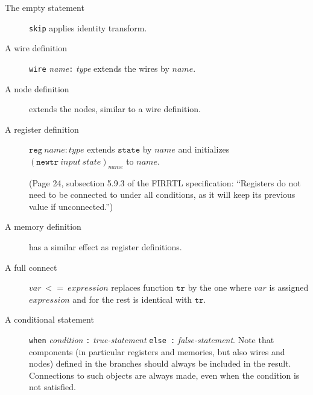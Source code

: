 \documentclass[a4paper]{article}
\begin{document}
\begin{description}

\item[The empty statement] \texttt{skip} applies identity transform.

\item[A wire definition] \texttt{wire} \textit{name}\texttt{:} \textit{type}
	extends the wires by $\mathit{name}$.

\item[A node definition]
	extends the nodes, similar to a wire definition.

\item[A register definition] $\mathtt{reg~}\mathit{name}\mathtt{: }\mathit{type}$
	extends $\mathtt{state}$ by $\mathit{name}$
	and initializes $(\mathtt{newtr~}\mathit{input}\mathtt{~}\mathit{state})_\mathit{name}$ to $\mathit{name}$.

	(Page 24, subsection 5.9.3 of the FIRRTL specification:
	``Registers do not need to be connected to under all conditions,
	as it will keep its previous value if unconnected.'')

\item[A memory definition] has a similar effect as register definitions.

\item[A full connect] $\mathit{var}\mathtt{~<=~}\mathit{expression}$
	replaces function $\mathtt{tr}$ by the one where $\mathit{var}$ is assigned $\mathit{expression}$ and for the rest is identical with $\mathtt{tr}$.

\item[A conditional statement]
	\texttt{when} \textit{condition} \texttt{:} \textit{true-statement} \texttt{else :} \textit{false-statement}.
	Note that components (in particular registers and memories, but also wires and nodes) defined in the branches
	should always be included in the result.
	Connections to such objects are always made, even when the condition is not satisfied.


\end{description}
\end{document}
